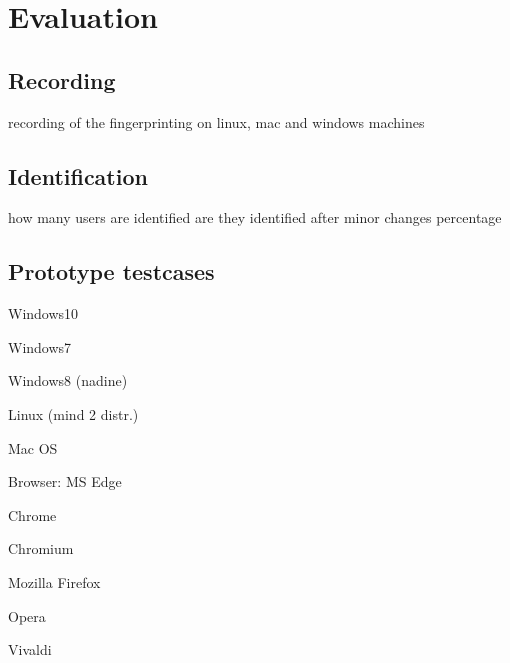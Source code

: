 \chapter{Evaluation}
\label{cha:evaluation}


\section{Recording}
recording of the fingerprinting
on linux, mac and windows machines

\section{Identification}
how many users are identified
are they identified after minor changes
percentage

\section{Prototype testcases}

Windows10

Windows7

Windows8 (nadine)

Linux (mind 2 distr.)

Mac OS

Browser:
MS Edge

Chrome

Chromium

Mozilla Firefox

Opera

Vivaldi